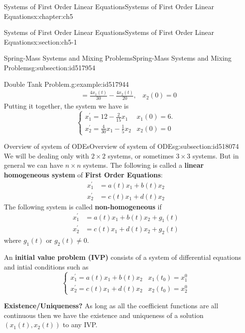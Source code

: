 \documentclass[oneside,10pt,]{book}
\newcommand{\terminology}[1]{\textbf{#1}}
\numberwithin{equation}{section}
\numberwithin{equation}{section}
\newcommand{\amp}{&}
\begin{document}
\begin{chapterptx}{Systems of First Order Linear Equations}{}{Systems of First Order Linear Equations}{}{}{x:chapter:ch5}
\begin{sectionptx}{Systems of First Order Linear Equations}{}{Systems of First Order Linear Equations}{}{}{x:section:ch5-1}
\begin{subsectionptx}{Spring-Mass Systems and Mixing Problems}{}{Spring-Mass Systems and Mixing Problems}{}{}{g:subsection:id517954}
\begin{example}{Double Tank Problem.}{g:example:id517944}
\begin{align*}
\amp =\frac{4x_{1}(t)}{30}-\frac{4x_{2}(t)}{20},\,\,\,\,\,x_{2}(0)=0
\end{align*}
Putting it together, the system we have is%
\begin{equation*}
\begin{cases}
x_{1}^{\prime}=12-\frac{2}{15}x_{1} \amp x_{1}(0)=6.\\
x_{2}^{\prime}=\frac{4}{30}x_{1}-\frac{1}{5}x_{2} \amp x_{2}(0)=0
\end{cases}
\end{equation*}
%
\end{example}
\end{subsectionptx}
%
%
\typeout{************************************************}
\typeout{************************************************}
%
\begin{subsectionptx}{Overview of system of ODEs}{}{Overview of system of ODEs}{}{}{g:subsection:id518074}
We will be dealing only with \(2\times2\) systems, or sometimes \(3\times3\) systems. But in general we can have \(n\times n\) systems. The following is called a \terminology{linear homogeneous system} of \terminology{First Order Equations}:%
\begin{align*}
x_{1}^{\prime} \amp =a(t)x_{1}+b(t)x_{2}\\
x_{2}^{\prime} \amp =c(t)x_{1}+d(t)x_{2}
\end{align*}
The following system is called \terminology{non-homogeneous} if%
\begin{align*}
x_{1}^{\prime} \amp =a(t)x_{1}+b(t)x_{2}+g_{1}(t)\\
x_{2}^{\prime} \amp =c(t)x_{1}+d(t)x_{2}+g_{2}(t)
\end{align*}
where \(g_{1}(t)\) or \(g_{2}(t)\neq 0\).%
\par
An \terminology{initial value problem (IVP)} consists of a system of differential equations and intial conditions such as%
\begin{equation*}
\begin{cases}
x_{1}^{\prime}=a(t)x_{1}+b(t)x_{2} \amp x_{1}(t_{0})=x_{1}^{0}\\
x_{2}^{\prime}=c(t)x_{1}+d(t)x_{2} \amp x_{2}(t_{0})=x_{2}^{0}
\end{cases}
\end{equation*}
%
\par
\terminology{Existence\slash{}Uniqueness?} As long as all the coefficient functions are all continuous then we have the existence and uniqueness of a solution \(\left(x_{1}(t),x_{2}(t)\right) \) to any IVP.%

\end{subsectionptx}
\end{sectionptx}
\end{chapterptx}
\end{document}
